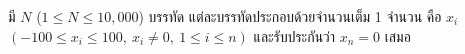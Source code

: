 \large{มี $N$ ($1 \le N \le 10,000$) บรรทัด แต่ละบรรทัดประกอบด้วยจำนวนเต็ม 1 จำนวน คือ $x_i$ $(-100 \le x_i \le 100, \ x_i \neq 0,\ 1 \le i \le n)$ และรับประกันว่า $x_n = 0$ เสมอ}
